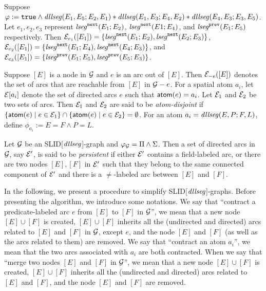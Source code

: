 \documentclass{llncs}
\begin{document}
\begin{example}
Suppose $\varphi:= \mathtt{true} \wedge \mathit{dllseg}(E_1, E_5; E_2, E_1) \ast \mathit{dllseg}(E_1, E_3; E_4, E_2) \ast \mathit{dllseg}(E_4, E_3; E_3, E_5)$. Let $e_1, e_2, e_3$ represent $\mathit{lseg}^{\mathtt{next}}(E_1; E_2)$, $\mathit{lseg}^{\mathtt{next}}(E1; E_4)$, and $\mathit{lseg}^{\mathtt{prev}}(E_1; E_5)$ respectively. Then $\mathcal{E}_{e_1}([E_1])=\{\mathit{lseg}^{\mathtt{next}}(E_1; E_2), \mathit{lseg}^{\mathtt{next}}(E_2; E_3)\}$, $\mathcal{E}_{e_2}([E_1])=\{\mathit{lseg}^{\mathtt{next}}(E_1; E_4), \mathit{lseg}^{\mathtt{next}}(E_4; E_3)\}$, and $\mathcal{E}_{e_3}([E_1])=\{\mathit{lseg}^{\mathtt{prev}}(E_1; E_5), \mathit{lseg}^{\mathtt{prev}}(E_5; E_3)\}$. 
\end{example}

Suppose $[E]$ is a node in $\mathcal{G}$ and $e$ is an arc out of $[E]$. Then $\mathcal{E}_{-e}([E])$ denotes the set of arcs that are reachable from $[E]$ in $\mathcal{G}-e$. For a spatial atom $a_i$, let $\mathcal{E}[{a_i}]$ denote the set of directed arcs $e$ such that $\mathsf{atom}(e) = a_i$. 
Let $\mathcal{E}_1$ and $\mathcal{E}_2$ be two sets of arcs. Then $\mathcal{E}_1$ and $\mathcal{E}_2$ are said to be \emph{atom-disjoint} if $\{\mathsf{atom}(e) \mid e \in \mathcal{E}_1\} \cap \{\mathsf{atom}(e) \mid e \in \mathcal{E}_2\} = \emptyset$. For an atom $a_i = \mathit{dllseg}(E, P; F , L)$, define $\phi_{a_i}:= E = F \wedge P = L$.


\begin{definition}
Let $\mathcal{G}$ be an SLID[$\mathit{dllseg}$]-graph and $\varphi_{\mathcal{G}} = \Pi \wedge \Sigma$. Then a set of directed arcs in $\mathcal{G}$, say $\mathcal{E}'$, is said to be \emph{persistent} if either $\mathcal{E}'$ contains a field-labeled arc, or there are two nodes $[E],[F]$ in  $\mathcal{E}'$ such that they belong to the same connected component of $\mathcal{E}'$ and there is  a $\neq$-labeled arc between $[E]$ and $[F]$.
\end{definition}

In the following, we present a procedure to simplify SLID[$\mathit{dllseg}$]-graphs.
Before presenting the algorithm, we introduce some notations. We say that ``contract a predicate-labeled arc $e$ from $[E]$ to $[F]$ in $\mathcal{G}$'', we mean that a new node $[E] \cup [F]$ is created, $[E] \cup [F]$ inherits all the (undirected and directed) arcs related to $[E]$ and $[F]$ in $\mathcal{G}$, except $e$, and the node $[E]$ and $[F]$ (as well as the arcs related to them) are removed.  We say that ``contract an atom $a_i$'', we mean that the two arcs associated with $a_i$ are both contracted. When we say that ``merge two nodes $[E]$ and $[F]$ in $\mathcal{G}$'', we mean that a new node $[E] \cup [F]$ is created, $[E] \cup [F]$ inherits all the (undirected and directed) arcs related to $[E]$ and $[F]$, and the node $[E]$ and $[F]$ are removed. 
\end{document}
